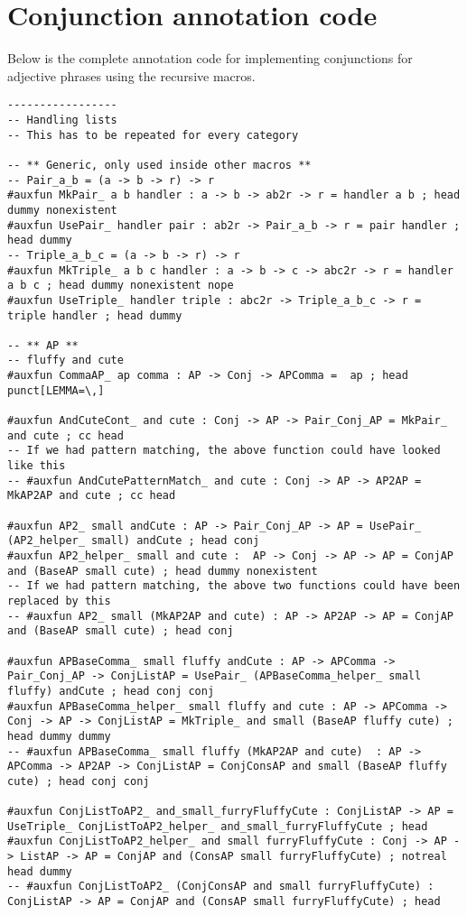 \chapter{Conjunction annotation code}\label{appendix:conjunctions}

Below is the complete annotation code for implementing conjunctions for adjective phrases using the recursive macros.

\begin{lstlisting}
-----------------
-- Handling lists
-- This has to be repeated for every category

-- ** Generic, only used inside other macros **
-- Pair_a_b = (a -> b -> r) -> r
#auxfun MkPair_ a b handler : a -> b -> ab2r -> r = handler a b ; head dummy nonexistent
#auxfun UsePair_ handler pair : ab2r -> Pair_a_b -> r = pair handler ; head dummy
-- Triple_a_b_c = (a -> b -> r) -> r
#auxfun MkTriple_ a b c handler : a -> b -> c -> abc2r -> r = handler a b c ; head dummy nonexistent nope
#auxfun UseTriple_ handler triple : abc2r -> Triple_a_b_c -> r = triple handler ; head dummy

-- ** AP **
-- fluffy and cute
#auxfun CommaAP_ ap comma : AP -> Conj -> APComma =  ap ; head punct[LEMMA=\,]

#auxfun AndCuteCont_ and cute : Conj -> AP -> Pair_Conj_AP = MkPair_ and cute ; cc head
-- If we had pattern matching, the above function could have looked like this
-- #auxfun AndCutePatternMatch_ and cute : Conj -> AP -> AP2AP = MkAP2AP and cute ; cc head

#auxfun AP2_ small andCute : AP -> Pair_Conj_AP -> AP = UsePair_ (AP2_helper_ small) andCute ; head conj
#auxfun AP2_helper_ small and cute :  AP -> Conj -> AP -> AP = ConjAP and (BaseAP small cute) ; head dummy nonexistent
-- If we had pattern matching, the above two functions could have been replaced by this
-- #auxfun AP2_ small (MkAP2AP and cute) : AP -> AP2AP -> AP = ConjAP and (BaseAP small cute) ; head conj

#auxfun APBaseComma_ small fluffy andCute : AP -> APComma -> Pair_Conj_AP -> ConjListAP = UsePair_ (APBaseComma_helper_ small fluffy) andCute ; head conj conj
#auxfun APBaseComma_helper_ small fluffy and cute : AP -> APComma -> Conj -> AP -> ConjListAP = MkTriple_ and small (BaseAP fluffy cute) ; head dummy dummy
-- #auxfun APBaseComma_ small fluffy (MkAP2AP and cute)  : AP -> APComma -> AP2AP -> ConjListAP = ConjConsAP and small (BaseAP fluffy cute) ; head conj conj

#auxfun ConjListToAP2_ and_small_furryFluffyCute : ConjListAP -> AP = UseTriple_ ConjListToAP2_helper_ and_small_furryFluffyCute ; head
#auxfun ConjListToAP2_helper_ and small furryFluffyCute : Conj -> AP -> ListAP -> AP = ConjAP and (ConsAP small furryFluffyCute) ; notreal head dummy
-- #auxfun ConjListToAP2_ (ConjConsAP and small furryFluffyCute) : ConjListAP -> AP = ConjAP and (ConsAP small furryFluffyCute) ; head


\end{lstlisting}
